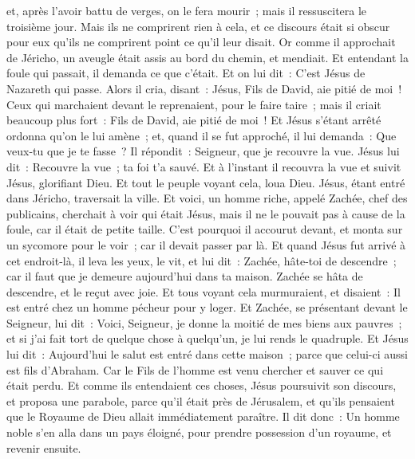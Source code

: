 \begin{multicols}{2}
et, après l'avoir battu de verges, on le fera mourir~; mais il ressuscitera le troisième jour.
Mais ils ne comprirent rien à cela, et ce discours était si obscur pour eux qu'ils ne comprirent point ce qu'il leur disait.
Or comme il approchait de Jéricho, un aveugle était assis au bord du chemin, et mendiait.
Et entendant la foule qui passait, il demanda ce que c'était.
Et on lui dit~: C'est Jésus de Nazareth qui passe.
Alors il cria, disant~: Jésus, Fils de David, aie pitié de moi~!
Ceux qui marchaient devant le reprenaient, pour le faire taire~; mais il criait beaucoup plus fort~: Fils de David, aie pitié de moi~!
Et Jésus s'étant arrêté ordonna qu'on le lui amène~; et, quand il se fut approché,
il lui demanda~: Que veux-tu que je te fasse~? Il répondit~: Seigneur, que je recouvre la vue.
Jésus lui dit~: Recouvre la vue~; ta foi t'a sauvé.
Et à l'instant il recouvra la vue et suivit Jésus, glorifiant Dieu. Et tout le peuple voyant cela, loua Dieu.
\VerseOne{}Jésus, étant entré dans Jéricho, traversait la ville.
Et voici, un homme riche, appelé Zachée, chef des publicains, cherchait à voir qui était Jésus,
mais il ne le pouvait pas à cause de la foule, car il était de petite taille.
C'est pourquoi il accourut devant, et monta sur un sycomore pour le voir~; car il devait passer par là.
Et quand Jésus fut arrivé à cet endroit-là, il leva les yeux, le vit, et lui dit~: Zachée, hâte-toi de descendre~; car il faut que je demeure aujourd'hui dans ta maison.
Zachée se hâta de descendre, et le reçut avec joie.
Et tous voyant cela murmuraient, et disaient~: Il est entré chez un homme pécheur pour y loger.
Et Zachée, se présentant devant le Seigneur, lui dit~: Voici, Seigneur, je donne la moitié de mes biens aux pauvres~; et si j'ai fait tort de quelque chose à quelqu'un, je lui rends le quadruple.
Et Jésus lui dit~: Aujourd'hui le salut est entré dans cette maison~; parce que celui-ci aussi est fils d'Abraham.
Car le Fils de l'homme est venu chercher et sauver ce qui était perdu.
Et comme ils entendaient ces choses, Jésus poursuivit son discours, et proposa une parabole, parce qu'il était près de Jérusalem, et qu'ils pensaient que le Royaume de Dieu allait immédiatement paraître.
Il dit donc~: Un homme noble s'en alla dans un pays éloigné, pour prendre possession d'un royaume, et revenir ensuite.

\end{multicols}
